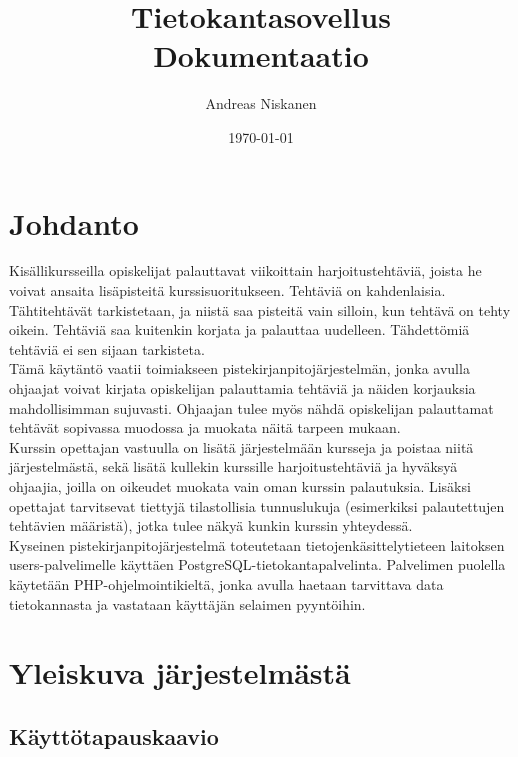 \documentclass[a4paper,12pt, titlepage]{article}
\title{Tietokantasovellus \\ Dokumentaatio}
\author{Andreas Niskanen}
\date{\today}
\begin{document}
\maketitle

\tableofcontents

\newpage

\section{Johdanto}

Kisällikursseilla opiskelijat palauttavat viikoittain harjoitustehtäviä,
joista he voivat ansaita lisäpisteitä kurssisuoritukseen. Tehtäviä on
kahdenlaisia. Tähtitehtävät tarkistetaan, ja niistä saa pisteitä vain
silloin, kun tehtävä on tehty oikein. Tehtäviä saa kuitenkin korjata ja
palauttaa uudelleen. Tähdettömiä tehtäviä ei sen sijaan tarkisteta.\\
Tämä käytäntö vaatii toimiakseen pistekirjanpitojärjestelmän, jonka avulla
ohjaajat voivat kirjata opiskelijan palauttamia tehtäviä ja näiden korjauksia
mahdollisimman sujuvasti. Ohjaajan tulee myös nähdä opiskelijan palauttamat
tehtävät sopivassa muodossa ja muokata näitä tarpeen mukaan.\\
Kurssin opettajan vastuulla on lisätä järjestelmään kursseja ja poistaa
niitä järjestelmästä, sekä lisätä kullekin kurssille harjoitustehtäviä ja
hyväksyä ohjaajia, joilla on oikeudet muokata vain oman kurssin palautuksia.
Lisäksi opettajat tarvitsevat tiettyjä tilastollisia tunnuslukuja (esimerkiksi
palautettujen tehtävien määristä), jotka tulee näkyä kunkin kurssin yhteydessä.\\
Kyseinen pistekirjanpitojärjestelmä toteutetaan tietojenkäsittelytieteen
laitoksen users-palvelimelle käyttäen PostgreSQL-tietokantapalvelinta.
Palvelimen puolella käytetään PHP-ohjelmointikieltä, jonka avulla haetaan
tarvittava data tietokannasta ja vastataan käyttäjän selaimen pyyntöihin.

\newpage

\section{Yleiskuva järjestelmästä}

\subsection{Käyttötapauskaavio}
\end{document}
